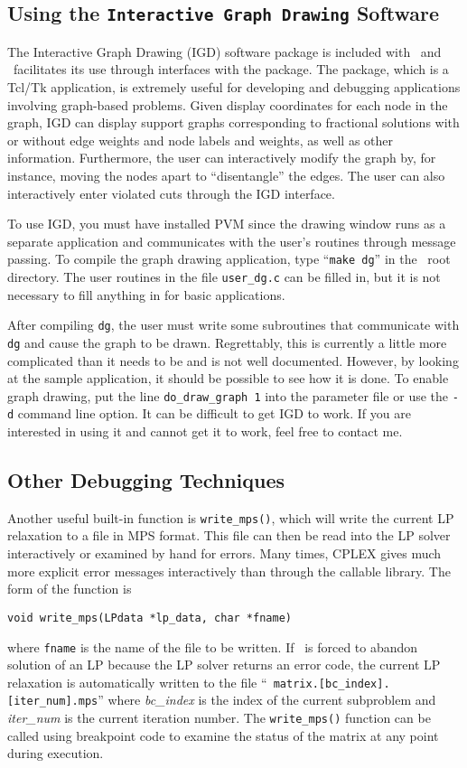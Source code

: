 \subsection{Using the {\tt Interactive Graph Drawing} Software}
\label{IGD}
The Interactive Graph Drawing (IGD) software package is included with
\BB\ and \BB\ facilitates its use through interfaces with the
package. The package, which is a Tcl/Tk application, is extremely
useful for developing and debugging applications involving graph-based
problems. Given display coordinates for each node in the graph, IGD
can display support graphs corresponding to fractional solutions with or
without edge weights and node labels and weights, as well as other
information. Furthermore, the user can interactively modify the graph
by, for instance, moving the nodes apart to ``disentangle'' the
edges. The user can also interactively enter violated cuts through the
IGD interface.

To use IGD, you must have installed PVM since the drawing window runs
as a separate application and communicates with the user's routines
through message passing. To compile the graph drawing application,
type ``{\tt make dg}'' in the \BB\ root directory. The user
routines in the file {\tt user\_dg.c} can be filled in, but it is not
necessary to fill anything in for basic applications. 

After compiling {\tt dg}, the user must write some subroutines that
communicate with {\tt dg} and cause the graph to be drawn.
Regrettably, this is currently a little more complicated than it needs
to be and is not well documented. However, by looking at the sample
application, it should be possible to see how it is done. To
enable graph drawing, put the line {\tt do\_draw\_graph 1} into the
parameter file or use the {\tt -d} command line option. It can be difficult to
get IGD to work. If you are interested in using it and cannot get it to work,
feel free to contact me.

\subsection{Other Debugging Techniques}

Another useful built-in function is \texttt{write\_mps()}, which will write the
current LP relaxation to a file in MPS format. This file can then be read into
the LP solver interactively or examined by hand for errors.  Many times, CPLEX
gives much more explicit error messages interactively than through the
callable library. The form of the function is
\begin{verbatim}
void write_mps(LPdata *lp_data, char *fname)
\end{verbatim}
where \texttt{fname} is the name of the file to be written. If \BB\ is forced
to abandon solution of an LP because the LP solver returns an error code, the
current LP relaxation is automatically written to the file ``{\tt
matrix.[bc\_index].[iter\_num].mps}'' where {\em bc\_index} is the index of
the current subproblem and {\em iter\_num} is the current iteration
number. The \texttt{write\_mps()} function can be called using breakpoint code
to examine the status of the matrix at any point during execution.

